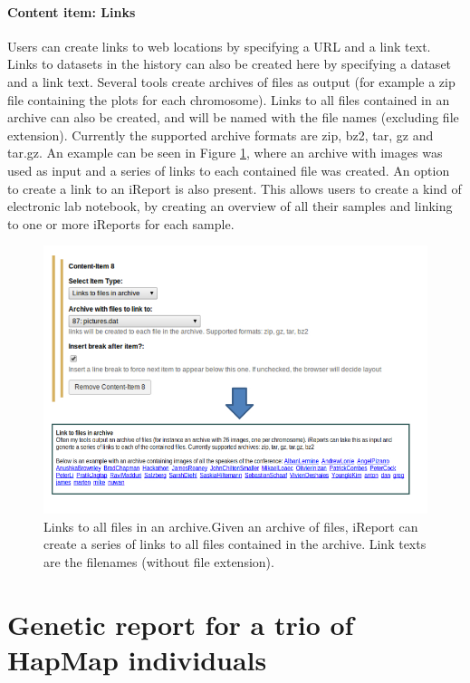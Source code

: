 \paragraph*{Content item: Links}
Users can create links to web locations by specifying a URL and a link text. Links to datasets in the history can also be created here by specifying a dataset and a link text. Several tools create archives of files as output (for example a zip file containing the plots for each chromosome). Links to all files contained in an archive can also be created, and will be named with the file names (excluding file extension). Currently the supported archive formats are zip, bz2, tar, gz and tar.gz. An example can be seen in Figure \ref{fig:archivelinks}, where an archive with images was used as input and a series of links to each contained file was created. An option to create a link to an iReport is also present. This allows users to create a kind of electronic lab notebook, by creating an overview of all their samples and linking to one or more iReports for each sample.

\begin{figure}[h!]
    \includegraphics[width=\textwidth]{chapters/images/iReport/Hiltemann_archivelinks.jpg}
    \caption{Links to all files in an archive.Given an archive of files, iReport can create a series of links to all files contained in the archive. Link texts are the filenames (without file extension).}
    \label{fig:archivelinks}
\end{figure}

\section*{Genetic report for a trio of HapMap individuals}

